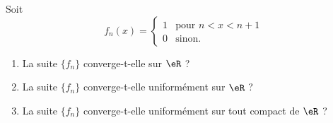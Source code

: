 

\begin{exercice}\label{exo113}

Soit 
\begin{equation}
	f_n(x)=
\begin{cases}
	1	&	\text{pour $n<x<n+1$}\\
	0	&	 \text{sinon.}
\end{cases}
\end{equation}

\begin{enumerate}
\item La suite $\{ f_n \}$ converge-t-elle sur $\eR$ ?
\item La suite $\{ f_n \}$ converge-t-elle uniformément sur $\eR$ ?
\item La suite $\{ f_n \}$ converge-t-elle uniformément sur tout compact de $\eR$ ?
\end{enumerate}

\end{exercice}
